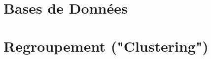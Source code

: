 \documentclass[10pt,letterpaper]{article}
\begin{document}
\TitlePAGE %
~
\section{Bases de Données}


\section{Regroupement ("Clustering")}
\end{document}
